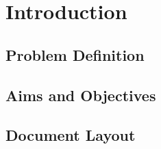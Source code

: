 \chapter{Introduction}
\section{Problem Definition}
\section{Aims and Objectives}
\section{Document Layout}

\blindtext

